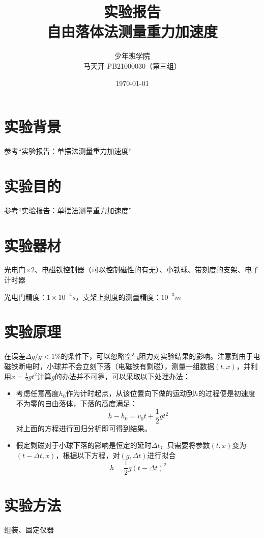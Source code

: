 \documentclass[a4paper]{ltxdoc}
\title{实验报告\\自由落体法测量重力加速度}
\author{少年班学院\\马天开 PB21000030（第三组）}
\date{\today}
\begin{document}
\begin{multicols}{2}
    \maketitle
    \section{实验背景}
    参考“实验报告：单摆法测量重力加速度”
    \section{实验目的}
    参考“实验报告：单摆法测量重力加速度”
    \section{实验器材}
    光电门$\times 2$、电磁铁控制器（可以控制磁性的有无）、小铁球、带刻度的支架、电子计时器

    光电门精度：$1\times 10^{-4} s$，支架上刻度的测量精度：$10^{-3}m$
    \section{实验原理}
    在误差$\Delta g/g<1\%$的条件下，可以忽略空气阻力对实验结果的影响。注意到由于电磁铁断电时，小球并不会立刻下落（电磁铁有剩磁），测量一组数据$(t,x)$，并利用$x=\frac 1 2 g t^2$计算$g$的办法并不可靠，可以采取以下处理办法：

    \begin{itemize}
        \item 考虑任意高度$h_0$作为计时起点，从该位置向下做的运动到$h$的过程便是初速度不为零的自由落体，下落的高度满足：
              \begin{equation}
                  h-h_0= v_0 t+ \dfrac 1 2 g t^2
              \end{equation}
              对上面的方程进行回归分析即可得到结果。

        \item 假定剩磁对于小球下落的影响是恒定的延时$\Delta t$，只需要将参数$(t,x)$变为$(t-\Delta t,x)$，根据以下方程，对$(g,\Delta t)$进行拟合
              \begin{equation}
                  h=\dfrac 1 2 g(t-\Delta t)^2
              \end{equation}
    \end{itemize}
    \section{实验方法}
    组装、固定仪器


\end{multicols}
\end{document}
